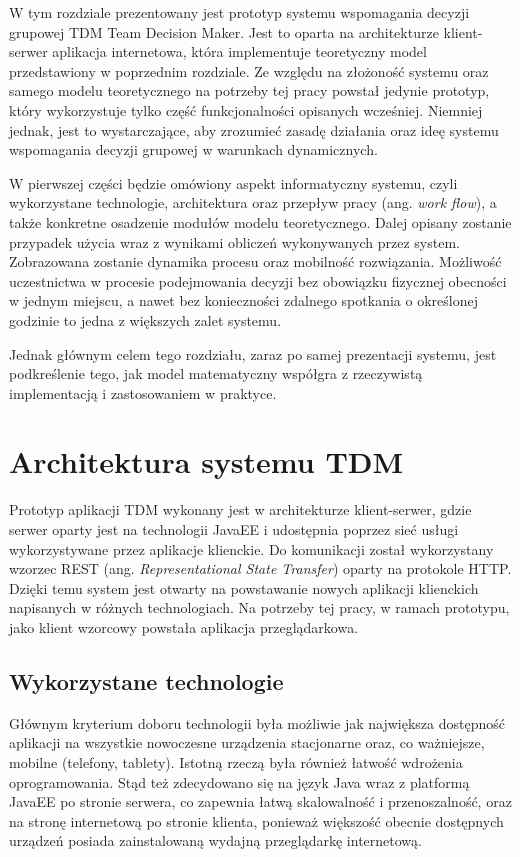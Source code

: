 W tym rozdziale prezentowany jest prototyp systemu wspomagania decyzji grupowej
TDM Team Decision Maker. Jest to oparta na architekturze klient-serwer
aplikacja internetowa, która implementuje teoretyczny model przedstawiony w
poprzednim rozdziale. Ze względu na złożoność systemu oraz samego modelu
teoretycznego na potrzeby tej pracy powstał jedynie prototyp, który wykorzystuje
tylko część funkcjonalności opisanych wcześniej. Niemniej jednak, jest to
wystarczające, aby zrozumieć zasadę działania oraz ideę systemu wspomagania
decyzji grupowej w warunkach dynamicznych.

W pierwszej części będzie omówiony aspekt informatyczny systemu,
czyli wykorzystane technologie, architektura oraz przepływ pracy (ang.
\textit{work flow}), a także konkretne osadzenie modułów modelu teoretycznego.
Dalej opisany zostanie przypadek użycia wraz z wynikami obliczeń
wykonywanych przez system. Zobrazowana zostanie dynamika procesu oraz mobilność
rozwiązania. Możliwość uczestnictwa w procesie podejmowania decyzji bez
obowiązku fizycznej obecności w jednym miejscu, a nawet bez konieczności
zdalnego spotkania o określonej godzinie to jedna z większych zalet systemu.

Jednak głównym celem tego rozdziału, zaraz po samej prezentacji systemu, jest
podkreślenie tego, jak model matematyczny współgra z rzeczywistą implementacją i
zastosowaniem w praktyce. 

\section{Architektura systemu TDM}
Prototyp aplikacji TDM wykonany jest w architekturze klient-serwer, gdzie serwer
oparty jest na technologii JavaEE i udostępnia poprzez sieć usługi
wykorzystywane przez aplikacje klienckie. Do komunikacji został wykorzystany
wzorzec REST (ang. \textit{Representational State Transfer}) oparty na protokole
HTTP. Dzięki temu system jest otwarty na powstawanie nowych aplikacji klienckich
napisanych w różnych technologiach. Na potrzeby tej pracy, w ramach prototypu,
jako klient wzorcowy powstała aplikacja przeglądarkowa.

\subsection{Wykorzystane technologie}
Głównym kryterium doboru technologii była możliwie jak największa dostępność
aplikacji na wszystkie nowoczesne urządzenia stacjonarne oraz, co ważniejsze,
mobilne (telefony, tablety). Istotną rzeczą była również łatwość wdrożenia
oprogramowania. Stąd też zdecydowano się na język Java wraz z platformą JavaEE
po stronie serwera, co zapewnia łatwą skalowalność i przenoszalność, oraz
na stronę internetową po stronie klienta, ponieważ większość obecnie dostępnych
urządzeń posiada zainstalowaną wydajną przeglądarkę internetową.

